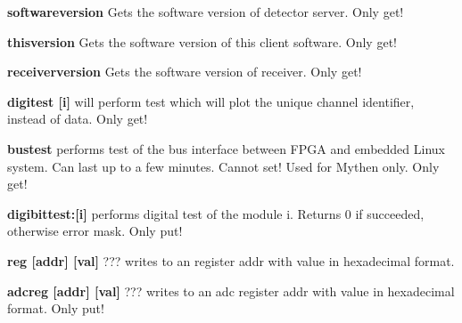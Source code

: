 \begin{DoxyItemize}
\item {\bfseries softwareversion} Gets the software version of detector server. Only get!
\end{DoxyItemize}


\begin{DoxyItemize}
\item {\bfseries thisversion} Gets the software version of this client software. Only get!
\end{DoxyItemize}


\begin{DoxyItemize}
\item {\bfseries receiverversion} Gets the software version of receiver. Only get!
\end{DoxyItemize}


\begin{DoxyItemize}
\item {\bfseries digitest \mbox{[}i\mbox{]}} will perform test which will plot the unique channel identifier, instead of data. Only get!
\end{DoxyItemize}


\begin{DoxyItemize}
\item {\bfseries bustest} performs test of the bus interface between FPGA and embedded Linux system. Can last up to a few minutes. Cannot set! Used for Mythen only. Only get!
\end{DoxyItemize}


\begin{DoxyItemize}
\item {\bfseries digibittest:\mbox{[}i\mbox{]}} performs digital test of the module i. Returns 0 if succeeded, otherwise error mask. Only put!
\end{DoxyItemize}


\begin{DoxyItemize}
\item {\bfseries reg \mbox{[}addr\mbox{]} \mbox{[}val\mbox{]}} ??? writes to an register {\ttfamily addr} with {\ttfamily value} in hexadecimal format.
\end{DoxyItemize}


\begin{DoxyItemize}
\item {\bfseries adcreg \mbox{[}addr\mbox{]} \mbox{[}val\mbox{]}} ??? writes to an adc register {\ttfamily addr} with {\ttfamily value} in hexadecimal format. Only put!
\end{DoxyItemize}


